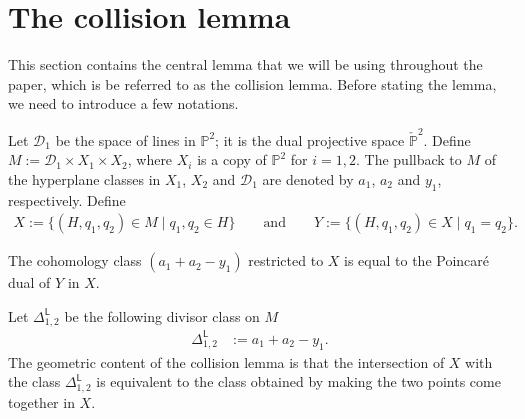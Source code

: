 \section{The collision lemma}
\label{coll_lemm}

This section contains the central lemma that we will be using throughout the paper, which is
be referred to as the collision lemma. Before stating the lemma, we need to introduce a few notations.

Let $\mathcal{D}_1$ be the space of lines in $\mathbb{P}^2$; it is the dual projective space $\check{\mathbb{P}}^2$. Define
$
M := \mathcal{D}_1 \times X_{1} \times X_{2}$,
where $X_i$ is a copy of $\mathbb{P}^2$ for $i = 1, 2$.
The pullback to $M$ of the hyperplane classes in
$X_{1}$, $X_{2}$ and $\mathcal{D}_1$ are denoted by $a_1$, $a_2$ and $y_1$, respectively. Define
\begin{align*}
X := \{ (H, q_1, q_2) \in M  \mid  q_1, q_2 \in H\}
\qquad \text{and}
\qquad
Y := \{ (H, q_1, q_2) \in X  \mid  q_1= q_2\}.
\end{align*}
\begin{lmm}\label{CL_ver2}
The cohomology class $(a_1+a_2-y_1)$ restricted to $X$ is equal to
the Poincar\'{e} dual of $Y$ in $X$.
\end{lmm}

\begin{rem}
 Let $\Delta_{1, 2}^{\mathsf{L}}$
be the following divisor class on $M$
\begin{align}
\Delta_{1, 2}^{\mathsf{L}}& := a_1 + a_2-y_1. \label{Line_Diag_Defn}
\end{align}
The geometric content of the collision lemma
is that the intersection of $X$ with the class $\Delta_{1, 2}^{\mathsf{L}}$ is equivalent to the class
obtained by making the two points come together in $X$. \end{rem}

